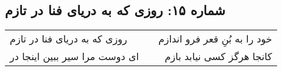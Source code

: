 \begin{center}
\section*{شماره ۱۵: روزی که به دریای فنا در تازم}
\label{sec:015}
\begin{longtable}{l p{0.5cm} r}
روزی که به دریای فنا در تازم
&&
خود را به بُنِ قعر فرو اندازم
\\
ای دوست مرا سیر ببین اینجا در
&&
کانجا هرگز کسی نیابد بازم
\\
\end{longtable}
\end{center}
